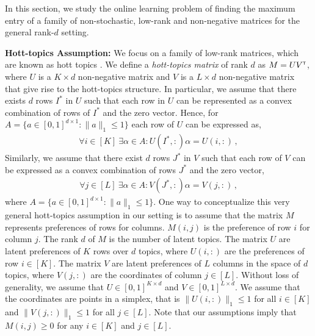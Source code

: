 
In this section, we study the online learning problem of finding the maximum entry of a family of non-stochastic, low-rank and non-negative matrices for the general rank-$d$ setting.  

\textbf{Hott-topics Assumption:} We focus on a family of low-rank matrices, which are known as hott topics \citep{recht2012factoring}. We define a \emph{hott-topics matrix} of rank $d$ as $M = U V^\mathsf{\scriptscriptstyle T}$, where $U$ is a $K \times d$ non-negative matrix and $V$ is a $L \times d$ non-negative matrix that give rise to the hott-topics structure. In particular, we assume that there exists $d$ rows $I^\ast$ in $U$ such that each row in $U$ can be represented as a convex combination of rows of $I^\ast$ and the zero vector. Hence, for $A = \{a \in [0, 1]^{d \times 1}: \|a\|_1 \leq 1\}$ each row of $U$ can be expressed as,
\begin{align}
  \forall i \in [K] \ \exists \alpha \in A: U(I^\ast, :) \alpha = U(i, :)\,,
  \label{eq:hott topics1}
\end{align}
Similarly, we assume that there exist $d$ rows $J^\ast$ in $V$ such that each row of $V$ can be expressed as a convex combination of rows $J^\ast$ and the zero vector,
\begin{align}
  \forall j \in [L] \ \exists \alpha \in A: V(J^\ast, :) \alpha = V(j, :)\,,
  \label{eq:hott topics}
\end{align}
where $A = \{a \in [0, 1]^{d \times 1}: \|a\|_1 \leq 1\}$. One way to conceptualize this very general hott-topics assumption in our setting  is to assume that the matrix $M$ represents preferences of rows for columns. $M(i, j)$ is the preference of row $i$ for column $j$. The rank $d$ of $M$ is the number of latent topics. The matrix $U$ are latent preferences of $K$ rows over $d$ topics, where $U(i, :)$ are the preferences of row $i \in [K]$. The matrix $V$ are latent preferences of $L$ columns in the space of $d$ topics, where $V(j, :)$ are the coordinates of column $j \in [L]$. Without loss of generality, we assume that $U \in [0, 1]^{K \times d}$ and $V \in [0, 1]^{L \times d}$. We assume that the coordinates are points in a simplex, that is $\|U(i, :)\|_1 \leq 1$ for all $i \in [K]$ and $\|V(j, :)\|_1 \leq 1$ for all $j \in [L]$. Note that our assumptions imply that $M(i, j) \geq 0$ for any $i \in [K]$ and $j \in [L]$.


